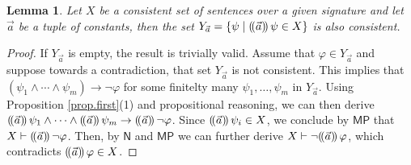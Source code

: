 \documentclass{article}
\newtheorem{lemma}{Lemma}
\begin{document}
\begin{lemma}\label{lemma:diamond}
Let $X$ be a consistent set of sentences over a given signature and let $\vec{a}$ be a tuple of constants,   
 then the set $Y_{\vec{a}}=\{\psi\mid (\!( \vec{a} )\!)\,\psi\in X\}$ is also consistent.
\end{lemma}
\begin{proof}
If $Y_{\vec{a}}$ is empty, the result is trivially valid. Assume that $\varphi \in Y_{\vec{a}}$ and  suppose
    towards a contradiction, that set $Y_{\vec{a}}$ is not consistent. This implies that $(\psi_1\land \cdots \land \psi_m)\to \neg \varphi$ for some finitelty many $\psi_1,\ldots, \psi_m$ in $Y_{\vec{a}}$. Using Proposition \ref{prop.first}(1) and propositional reasoning, we can then derive $(\!( \vec{a} )\!)\,\psi_1 \land \cdots \land (\!( \vec a )\!)\,\psi_m\to (\!( \vec a )\!)\, \neg \varphi  $. Since $(\!( \vec{a} )\!)\,\psi_i\in X$, we conclude by $\mathsf{MP}$ that $X \vdash (\!( \vec a )\!)\, \neg \varphi$. Then, by $\mathsf{N}$ and $\mathsf{MP}$  we can further derive $X\vdash \neg (\!( \vec{a} )\!)\,\varphi$, which contradicts $(\!( \vec a )\!)\, \varphi\in X$. 
\end{proof}



\end{document}
